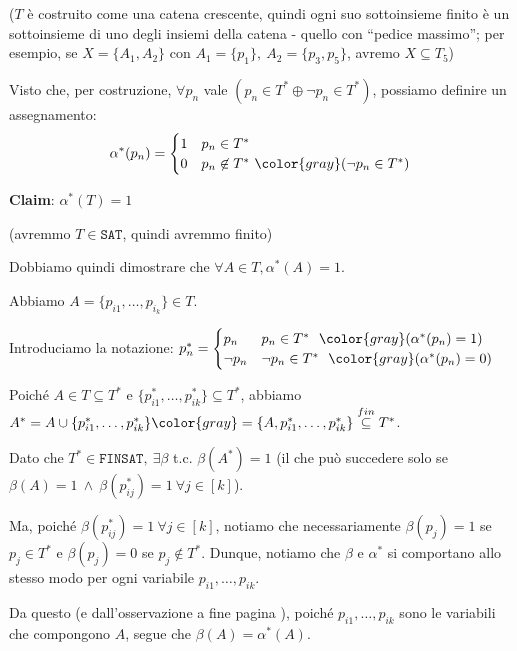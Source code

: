 \documentclass[a4paper,11pt]{report}
\begin{document}
(\( T \) è costruito come una catena crescente, quindi ogni suo sottoinsieme finito è un sottoinsieme di uno degli insiemi della catena - quello con ``pedice massimo'';
per esempio, se \( X = \{A_1, A_2\} \) con \( A_1 = \{p_1\}, \ A_2 = \{p_3, p_5\}\), avremo \( X \subseteq T_5 \))

Visto che, per costruzione, \( \forall p_n \) vale \( ( p_n \in T^* \oplus \neg p_n \in T^* )\), possiamo definire un assegnamento:
\[ \alpha^*(p_n) = \begin{cases}
    1 & p_n \in T^* \\
    0 & p_n \not\in T^* \ {\color{gray} (\neg p_n \in T^*)}\\
\end{cases} \]

\begin{gframe}[colframe=DeepTeal, colback=DeepTealLight]{}
    \textbf{Claim}: \( \alpha^*(T) = 1 \)
    
    {\small\color{gray}(avremmo \( T\in \texttt{SAT} \), quindi avremmo finito)}
\end{gframe}

Dobbiamo quindi dimostrare che \( \forall A \in T, \alpha^*(A) = 1 \).

Abbiamo \( A = \{p_{i1}, \dots, p_{i_k} \}\in T\).

Introduciamo la notazione: \( p_n^* = \begin{cases}
    p_n & p_n \in T^* \  \ {\color{gray} (\alpha^*(p_n)=1)} \\
    \neg p_n & \neg p_n \in T^* \  \ {\color{gray} (\alpha^*(p_n)=0)} \\
\end{cases} \)

Poiché \( A\in T \subseteq T^* \) e \( \{p^*_{i1}, \dots, p^*_{ik}\} \subseteq T^*\), abbiamo \( A^* = A \cup \{p^*_{i1}, \dots, p^*_{ik}\} {\color{gray}= \{A, p^*_{i1}, \dots, p^*_{ik}\}} \overset{fin}{\subseteq } T^*\).

Dato che \( T^* \in \texttt{FINSAT}, \ \exists \beta \) t.c. \( \beta(A^*)=1 \) (il che può succedere solo se \( \beta(A) = 1 \ \land \ \beta(p^*_{ij}) = 1 \ \forall j \in [k] \)).

Ma, poiché \( \beta(p^*_{ij}) = 1 \ \forall j \in [k]  \), notiamo che necessariamente \( \beta(p_j) = 1  \) se \( p_j \in T^* \) e \( \beta(p_j) = 0  \) se \( p_j \not\in T^* \). Dunque, notiamo che \( \beta \) e \( \alpha^* \) si comportano allo stesso modo per ogni variabile \( p_{i1}, \dots, p_{ik} \).

Da questo (e dall'osservazione a fine pagina \pageref{asseq}), poiché \( p_{i1}, \dots, p_{ik} \) sono le variabili che compongono \( A \), segue che \( \beta(A) = \alpha^*(A) \).
\end{document}
